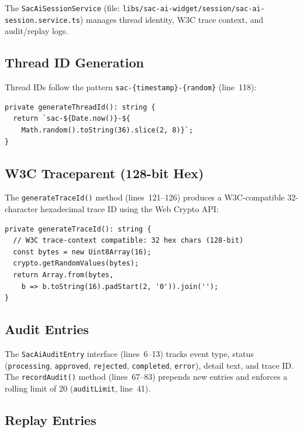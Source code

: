 \documentclass[11pt]{article}
\begin{document}
The \texttt{SacAiSessionService} (file:
\texttt{libs/sac-ai-widget/session/sac-ai-session.service.ts}) manages thread
identity, W3C trace context, and audit/replay logs.

\subsection{Thread ID Generation}

Thread IDs follow the pattern \texttt{sac-\{timestamp\}-\{random\}}
(line~118):

\begin{lstlisting}[language={[Sharp]C},caption={Thread ID format (sac-ai-session.service.ts:117--119)}]
private generateThreadId(): string {
  return `sac-${Date.now()}-${
    Math.random().toString(36).slice(2, 8)}`;
}
\end{lstlisting}

\subsection{W3C Traceparent (128-bit Hex)}

The \texttt{generateTraceId()} method (lines~121--126) produces a
W3C-compatible 32-character hexadecimal trace ID using the Web Crypto API:

\begin{lstlisting}[language={[Sharp]C},caption={Trace ID generation (sac-ai-session.service.ts:121--126)}]
private generateTraceId(): string {
  // W3C trace-context compatible: 32 hex chars (128-bit)
  const bytes = new Uint8Array(16);
  crypto.getRandomValues(bytes);
  return Array.from(bytes,
    b => b.toString(16).padStart(2, '0')).join('');
}
\end{lstlisting}

\subsection{Audit Entries}

The \texttt{SacAiAuditEntry} interface (lines~6--13) tracks event type, status
(\texttt{processing}, \texttt{approved}, \texttt{rejected}, \texttt{completed},
\texttt{error}), detail text, and trace ID. The \texttt{recordAudit()} method
(lines~67--83) prepends new entries and enforces a rolling limit of 20
(\texttt{auditLimit}, line~41).

\subsection{Replay Entries}
\end{document}
